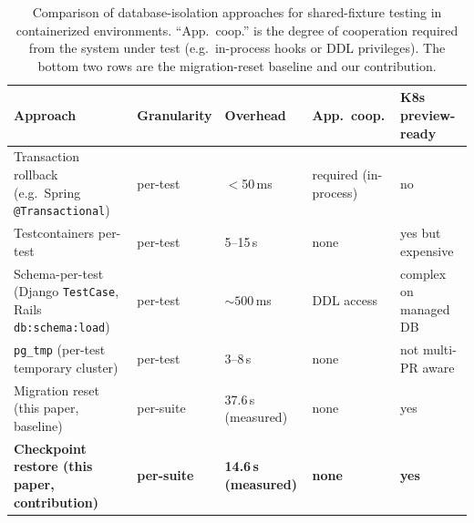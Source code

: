 
\begin{table}[t]
  \caption{Comparison of database-isolation approaches for shared-fixture
           testing in containerized environments. ``App.\ coop.'' is the
           degree of cooperation required from the system under test
           (e.g.\ in-process hooks or DDL privileges). The bottom two
           rows are the migration-reset baseline and our contribution.}
  \label{tab:related}
  \small
  \centering
  \begin{tabular}{lllll}
    \toprule
    \textbf{Approach} & \textbf{Granularity} & \textbf{Overhead} &
      \textbf{App.\ coop.} & \textbf{K8s preview-ready} \\
    \midrule
    Transaction rollback (e.g.\ Spring \texttt{@Transactional})
      & per-test  & $<$50\,ms  & required (in-process) & no \\
    Testcontainers per-test
      & per-test  & 5--15\,s   & none & yes but expensive \\
    Schema-per-test (Django \texttt{TestCase}, Rails \texttt{db:schema:load})
      & per-test  & ${\sim}500$\,ms & DDL access & complex on managed DB \\
    \texttt{pg\_tmp} (per-test temporary cluster)
      & per-test  & 3--8\,s    & none & not multi-PR aware \\
    Migration reset (this paper, baseline)
      & per-suite & 37.6\,s (measured) & none & yes \\
    \textbf{Checkpoint restore (this paper, contribution)}
      & \textbf{per-suite} & \textbf{14.6\,s (measured)} & \textbf{none}
      & \textbf{yes} \\
    \bottomrule
  \end{tabular}
\end{table}
